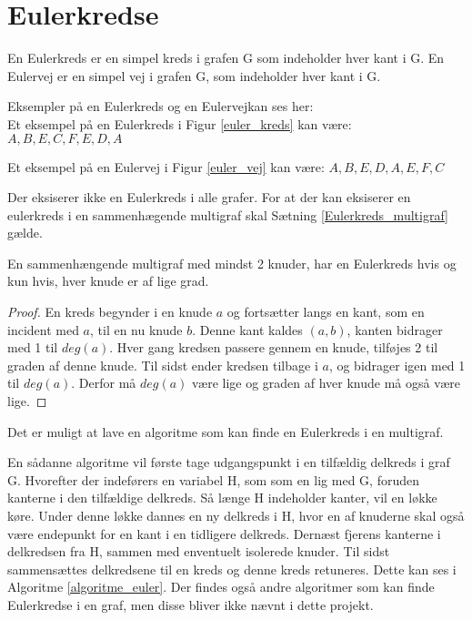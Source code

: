 \section{Eulerkredse}

\begin{defn}\label{euler_def}
En Eulerkreds er en simpel kreds i grafen G som indeholder hver kant i G.
En Eulervej er en simpel vej i grafen G, som indeholder hver kant i G.  
\end{defn}
\noindent Eksempler på en Eulerkreds og en Eulervejkan ses her: \\


\noindent Et eksempel på en Eulerkreds i Figur \ref{euler_kreds} kan være: $A,B,E,C,F,E,D,A$



\noindent Et eksempel på en Eulervej i Figur \ref{euler_vej} kan være: $A,B,E,D,A,E,F,C$

Der eksiserer ikke en Eulerkreds i alle grafer. 
For at der kan eksiserer en eulerkreds i en sammenhægende multigraf skal Sætning \ref{Eulerkreds_multigraf} gælde. 

\begin{thm}\label{Eulerkreds_multigraf}
En sammenhængende multigraf med mindst 2 knuder, har en Eulerkreds hvis og kun hvis, hver knude er af lige grad.
\end{thm}

\begin{proof} 
En kreds begynder i en knude $a$ og fortsætter langs en kant, som en incident med $a$, til en nu knude $b$. 
Denne kant kaldes $(a,b)$, kanten bidrager med 1 til $deg(a)$. 
Hver gang kredsen passere gennem en knude, tilføjes 2 til graden af denne knude. 
Til sidst ender kredsen tilbage i $a$, og bidrager igen med 1 til $deg(a)$. 
Derfor må $deg(a)$ være lige og graden af hver knude må også være lige.  
\end{proof} 

\noindent Det er muligt at lave en algoritme som kan finde en Eulerkreds i en multigraf.

En sådanne algoritme vil første tage udgangspunkt i en tilfældig delkreds i graf G. 
Hvorefter der indeførers en variabel H, som som en lig med G, foruden kanterne i den tilfældige delkreds. 
Så længe H indeholder kanter, vil en løkke køre. 
Under denne løkke dannes en ny delkreds i H, hvor en af knuderne skal også være endepunkt for en kant i en tidligere delkreds.
Dernæst fjerens kanterne i delkredsen fra H, sammen med enventuelt isolerede knuder. 
Til sidst sammensættes delkredsene til en kreds og denne kreds retuneres.
Dette kan ses i Algoritme \ref{algoritme_euler}.
Der findes også andre algoritmer som kan finde Eulerkredse i en graf, men disse bliver ikke nævnt i dette projekt.\\
  

